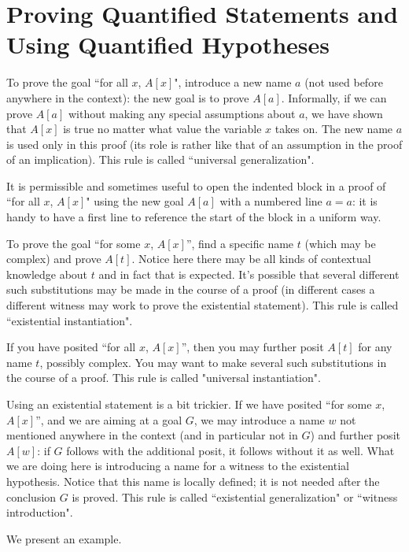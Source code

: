 \documentclass[12pt]{book}
\begin{document}
\section{Proving Quantified Statements and Using Quantified Hypotheses}

To prove the goal ``for all $x$, $A[x]$", introduce a new name $a$ (not
used before anywhere in the context): the new goal is to prove $A[a]$.
Informally, if we can prove $A[a]$ without making any special
assumptions about $a$, we have shown that $A[x]$ is true no matter
what value the variable $x$ takes on.  The new name $a$ is used only
in this proof (its role is rather like that of an assumption in the
proof of an implication).   This rule is called ``universal generalization".

It is permissible and sometimes useful to open the indented block in a proof of ``for all $x$, $A[x]$"
using the new goal $A[a]$ with a numbered line $a=a$:  it is handy to have a first line to reference the start of the block in a uniform way.

To prove the goal ``for some $x$, $A[x]$'', find a specific name $t$
(which may be complex) and prove $A[t]$.  Notice here there may be all
kinds of contextual knowledge about $t$ and in fact that is expected.
It's possible that several different such substitutions may be made in
the course of a proof (in different cases a different witness may work
to prove the existential statement).   This rule is called ``existential instantiation".

If you have posited ``for all $x$, $A[x]$'', then you may further
posit $A[t]$ for any name $t$, possibly complex.  You may want to make
several such substitutions in the course of a proof.   This rule is called "universal instantiation".

\newpage

Using an existential statement is a bit trickier.  If we have posited
``for some $x$, $A[x]$'', and we are aiming at a goal $G$, we may
introduce a name $w$ not mentioned anywhere in the context (and in
particular not in $G$) and further posit $A[w]$: if $G$ follows with
the additional posit, it follows without it as well.  What we are
doing here is introducing a name for a witness to the existential
hypothesis.  Notice that this name is locally defined; it is not
needed after the conclusion $G$ is proved.   This rule is called ``existential generalization" or ``witness introduction".

We present an example.
\end{document}
